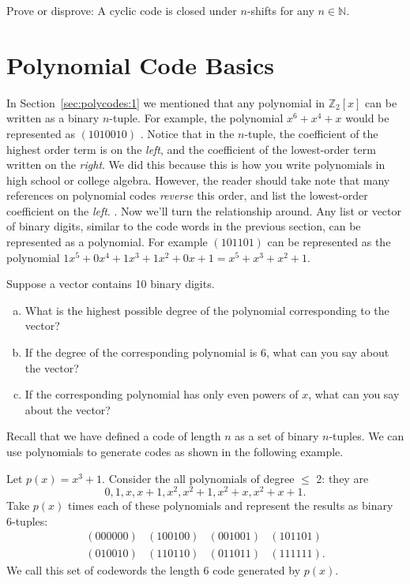 \begin {exercise} {}
Prove or disprove: A cyclic code is closed under $n$-shifts for any $n \in \mathbb{N}$.
\end {exercise}

\section {Polynomial Code Basics}

In Section~\ref{sec:polycodes:1} we mentioned that  any polynomial in $\mathbb{Z}_2[x]$ can be written as a binary $n$-tuple.  For example, the polynomial $x^6 + x^4 + x$ would be represented as $(1010010)$ . Notice that in the $n$-tuple, the coefficient of the highest order term is on the \emph{left}, and the coefficient of the lowest-order term written on the \emph{right}.  We did this because this is how you write polynomials in high school or college algebra.  However, the reader should take note that many references on polynomial codes  \emph{reverse} this order, and list the lowest-order coefficient on the \emph{left}.
.
Now we'll turn the relationship around. Any list or vector of binary digits, similar to the code words in the previous section, can be represented as a polynomial. For example $(101101)$ can be represented as the polynomial $1x^5 + 0x^4 + 1x^3 + 1x^2 + 0x + 1 = x^5 + x^3 + x^2 + 1$.  

\begin {exercise}{}
Suppose a vector contains 10 binary digits.
\begin{enumerate}[(a)]
\item
 What is the highest possible degree of the polynomial corresponding to the vector?
\item
If the degree of the corresponding polynomial is 6, what can you say about the vector?
\item
If the corresponding polynomial has only even powers of $x$, what can you say about the vector?
\end{enumerate}
\end{exercise}

Recall that we have defined a code of length $n$ as a set of binary $n$-tuples.  We can use polynomials to generate codes as shown in the following example. 

\begin {example}{}
Let $p(x) = x^3 + 1$.  Consider the all polynomials of degree $\le$ 2: they are \[0, 1, x, x+1, x^2, x^2+1, x^2 + x, x^2 + x + 1.\]  Take $p(x)$ times each of these polynomials and represent the results as binary 6-tuples:
 \[ \begin{array}{cccc}
(000000) & (100100) & (001001) & (101101) \\
(010010) & (110110) & (011011) & (111111).
\end{array}\]
We call this set of codewords the length 6 code generated by $p(x)$.
\end {example}


